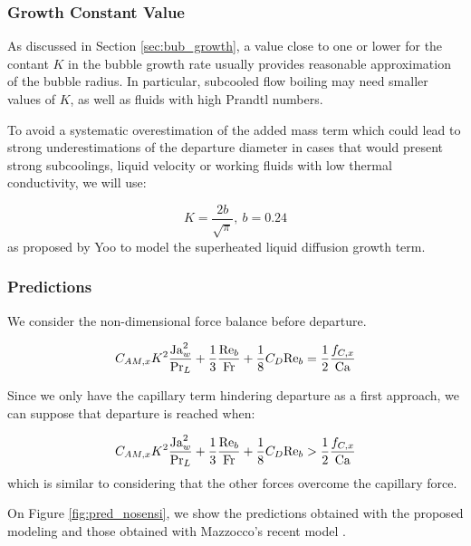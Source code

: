 \subsubsection{Growth Constant Value}

As discussed in Section \ref{sec:bub_growth}, a value close to one or lower for the contant $K$ in the bubble growth rate usually provides reasonable approximation of the bubble radius. In particular, subcooled flow boiling may need smaller values of $K$, as well as fluids with high Prandtl numbers. 

\npar

To avoid a systematic overestimation of the added mass term which could lead to strong underestimations of the departure diameter in cases that would present strong subcoolings, liquid velocity or working fluids with low thermal conductivity, we will use:

\begin{equation}
K=\frac{2b}{\sqrt{\pi}},\ b=0.24
\end{equation}
as proposed by Yoo \etal \cite{yoo_development_2018} to model the superheated liquid diffusion growth term.


\subsubsection{Predictions}

We consider the non-dimensional force balance before departure.

\begin{equation}
C_{AM,x}K^{2} \frac{\mathrm{Ja}_{w}^{2}}{\mathrm{Pr}_{L}} + \frac{1}{3}\frac{\mathrm{Re}_{b}}{\mathrm{Fr}} + \frac{1}{8}C_{D}\mathrm{Re}_{b} = \frac{1}{2} \frac{f_{C,x}}{\mathrm{Ca}}
\end{equation}

Since we only have the capillary term hindering departure as a first approach, we can suppose that departure is reached when:

\begin{equation}
C_{AM,x}K^{2} \frac{\mathrm{Ja}_{w}^{2}}{\mathrm{Pr}_{L}} + \frac{1}{3}\frac{\mathrm{Re}_{b}}{\mathrm{Fr}} + \frac{1}{8}C_{D}\mathrm{Re}_{b} > \frac{1}{2} \frac{f_{C,x}}{\mathrm{Ca}}
\label{eq:pred_nogr}
\end{equation}
which is similar to considering that the other forces overcome the capillary force.


\npar
On Figure \ref{fig:pred_nosensi}, we show the predictions obtained with the proposed modeling and those obtained with Mazzocco's recent model \cite{mazzocco_reassessed_2018}. 


